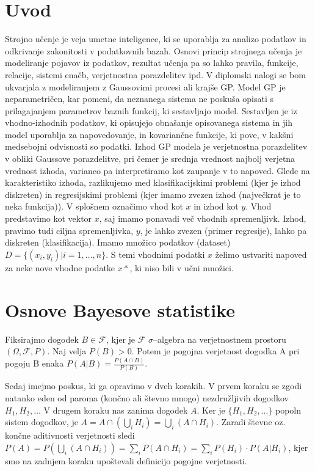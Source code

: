 \documentclass[12pt,a4paper]{amsart}
\theoremstyle{definition} %
\theoremstyle{plain} %
\begin{document}
\section{Uvod}
Strojno učenje je veja umetne inteligence, ki se uporablja za analizo podatkov in odkrivanje zakonitosti v podatkovnih bazah. Osnovi princip strojnega učenja je modeliranje pojavov iz podatkov, rezultat učenja pa so lahko pravila, funkcije, relacije, sistemi enačb, verjetnostna porazdelitev ipd. 
V diplomski nalogi se bom ukvarjala z modeliranjem z Gaussovimi procesi ali krajše GP. Model GP je neparametričen, kar pomeni, da neznanega sistema ne poskuša opisati s prilagajanjem parametrov baznih funkcij, ki sestavljajo model. Sestavljen je iz vhodno-izhodnih podatkov, ki opisujejo obnašanje opisovanega sistema in jih model uporablja za napovedovanje, in kovariančne funkcije, ki pove, v kakšni medsebojni odvisnosti so podatki. Izhod GP modela je verjetnostna porazdelitev v obliki Gaussove porazdelitve, pri čemer je srednja vrednost najbolj verjetna vrednost izhoda, varianco pa interpretiramo kot zaupanje v to napoved. 
Glede na karakteristiko izhoda, razlikujemo med klasifikacijskimi problemi (kjer je izhod diskreten) in regresijskimi problemi (kjer imamo zvezen izhod (največkrat je to neka funkcija)). 
V splošnem označimo vhod kot $x$ in izhod kot $y$. Vhod predstavimo kot vektor $x$, saj imamo ponavadi več vhodnih spremenljivk. Izhod, pravimo tudi ciljna spremenljivka, $y$, je lahko zvezen (primer regresije), lahko pa diskreten (klasifikacija). 
Imamo množico podatkov (dataset) $ D = \{ (x_i, y_i) | i = 1, \ldots, n\}. $  S temi vhodnimi podatki $x$ želimo ustvariti napoved za neke nove vhodne podatke $x*$, ki niso bili v učni množici. 


\section{Osnove Bayesove statistike}
 Fiksirajmo dogodek $ B \in \mathcal{F}$, kjer je $\mathcal{F}$  $\sigma$--algebra na verjetnostnem prostoru $(\Omega, \mathcal{F}, P)$. Naj velja $P(B)>0$. Potem je pogojna verjetnost dogodka A pri pogoju B enaka $P(A|B) = \frac{P(A \cap B)}{P(B)} $.

Sedaj imejmo poskus, ki ga opravimo v dveh korakih. V prvem koraku se zgodi natanko eden od paroma (končno ali števno mnogo) nezdružljivih dogodkov $H_{1}, H_{2}, \ldots$ V drugem koraku nas zanima dogodek $A$. Ker je $\{H_{1}, H_{2}, \ldots\}$ popoln sistem dogodkov, je $ A = A \cap (\bigcup\limits_{i} H_{i}) = \bigcup\limits_{i} (A \cap H_{i})$. Zaradi števne oz. končne aditivnosti verjetnosti sledi $ P(A) = P( \bigcup\limits_{i} (A \cap H_{i})) = \sum\limits_{i} P(A \cap H_{i}) = \sum\limits_{i} P(H_{i}) \cdot P(A|H_{i})$, kjer smo na zadnjem koraku upoštevali definicijo pogojne verjetnosti.
\end{document}
